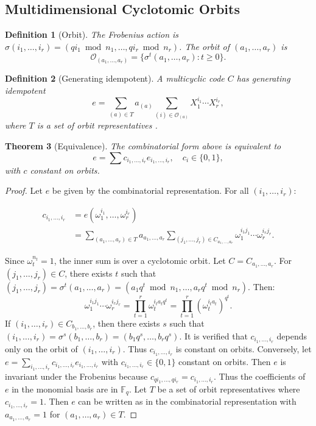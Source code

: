 \documentclass[10pt,twocolumn]{IEEEtran}
\theoremstyle{plain}
\newtheorem{thm}{Theorem}[section]
\newtheorem{defi}[thm]{Definition}
\theoremstyle{definition}
\newcommand{\Fq}{\mathbb{F}_q}
\newcommand{\orb}{\mathcal{O}}
\begin{document}
\subsection{Multidimensional Cyclotomic Orbits}
\begin{defi}[Orbit]\label{def:orb-rdim}
The Frobenius action is $\sigma(i_1,\dots,i_r) = (q i_1 \bmod n_1, \dots, q i_r \bmod n_r)$. The orbit of $(a_1,\dots,a_r)$ is
\[
\orb_{(a_1,\dots,a_r)} = \{\sigma^t(a_1,\dots,a_r) : t\ge 0\}.
\]
\end{defi}

\begin{defi}[Generating idempotent]
A multicyclic code $C$ has generating idempotent
\[
e = \sum_{(a)\in T} a_{(a)} \sum_{(i)\in\orb_{(a)}} X_1^{i_1}\cdots X_r^{i_r},
\]
where $T$ is a set of orbit representatives \cite{han2022}.
\end{defi}

\begin{thm}[Equivalence]\label{thm:equiv}
The combinatorial form above is equivalent to
\[
e = \sum c_{i_1,\dots,i_r} e_{i_1,\dots,i_r}, \quad c_{i} \in\{0,1\},
\]
with $c$ constant on orbits.
\end{thm}
\begin{proof}
Let $e$ be given by the combinatorial representation. For all $(i_1,\dots,i_r)$:

\begin{align}
c_{i_1,\dots,i_r}
&= e(\omega_1^{i_1},\dots,\omega_r^{i_r}) \\
&= \sum_{(a_1,\dots,a_r) \in T} a_{a_1,\dots,a_r}
   \sum_{(j_1,\dots,j_r) \in C_{a_1,\dots,a_r}}
   \omega_1^{i_1 j_1} \cdots \omega_r^{i_r j_r}.
\end{align}

Since $\omega_t^{n_t} = 1$, the inner sum is over a cyclotomic orbit. Let $C = C_{a_1,\dots,a_r}$. For $(j_1,\dots,j_r) \in C$, there exists $t$ such that $(j_1,\dots,j_r) = \sigma^t(a_1,\dots,a_r) = (a_1 q^t \bmod n_1, \dots, a_r q^t \bmod n_r)$. Then:
\[
\omega_1^{i_1 j_1} \cdots \omega_r^{i_r j_r} = \prod_{t=1}^r \omega_t^{i_t a_t q^t} = \prod_{t=1}^r (\omega_t^{i_t a_t})^{q^t}.
\]
If $(i_1,\dots,i_r) \in C_{b_1,\dots,b_r}$, then there exists $s$ such that $(i_1,\dots,i_r) = \sigma^s(b_1,\dots,b_r) = (b_1 q^s, \dots, b_r q^s)$. It is verified that $c_{i_1,\dots,i_r}$ depends only on the orbit of $(i_1,\dots,i_r)$. Thus $c_{i_1,\dots,i_r}$ is constant on orbits.
Conversely, let $e = \sum_{i_1,\dots,i_r} c_{i_1,\dots,i_r} e_{i_1,\dots,i_r}$ with $c_{i_1,\dots,i_r} \in \{0,1\}$ constant on orbits. Then $e$ is invariant under the Frobenius because $c_{q i_1, \dots, q i_r} = c_{i_1,\dots,i_r}$. Thus the coefficients of $e$ in the monomial basis are in $\Fq$. Let $T$ be a set of orbit representatives where $c_{i_1,\dots,i_r} = 1$. Then $e$ can be written as in the combinatorial representation with $a_{a_1,\dots,a_r} = 1$ for $(a_1,\dots,a_r) \in T$.
\end{proof}
\end{document}
